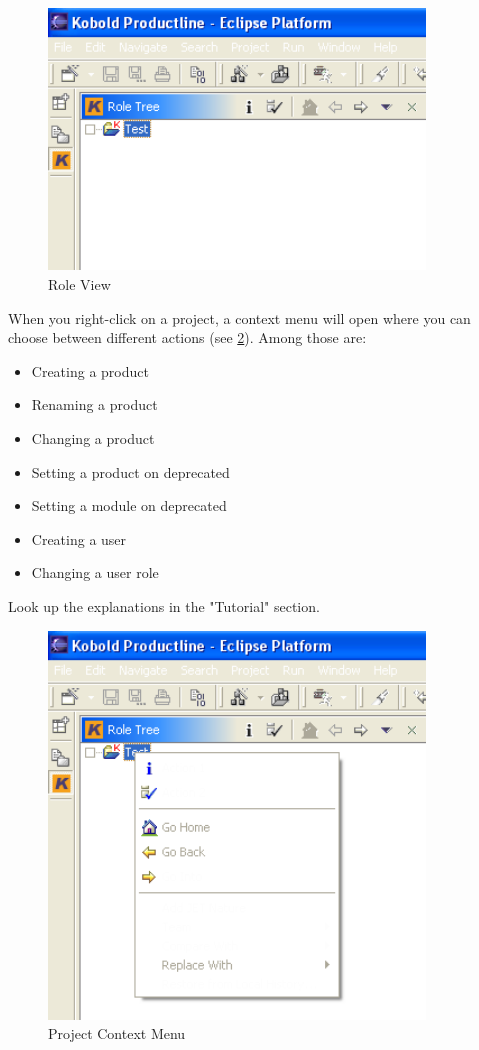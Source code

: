 \begin{figure}[h!]
\begin{center}
\includegraphics[width=10cm]{roletree.png}
   \caption{Role View}
\label{roletree}
\end{center}
\end{figure}\par

When you right-click on a project, a context menu will open where you can choose 
between different actions (see \ref{rolekontext}). Among those are:

\begin{itemize}
	\item Creating a product
	\item Renaming a product
	\item Changing a product
	\item Setting a product on deprecated
	\item Setting a module on deprecated
	\item Creating a user
	\item Changing a user role
\end{itemize}
Look up the explanations in the "Tutorial" section.

\begin{figure}[h!]
\begin{center}
\includegraphics[width=10cm]{rolekontext.png}
   \caption{Project Context Menu}
\label{rolekontext}
\end{center}
\end{figure}\par



